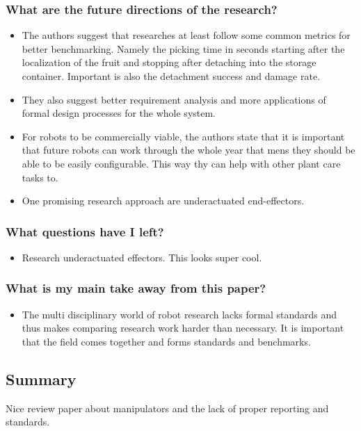     \subsubsection*{What are the future directions of the research?}
    \begin{itemize}
        \item The authors suggest that researches at least follow some common metrics for better benchmarking. Namely the picking time in seconds starting after the localization of the fruit and stopping after detaching into the storage container. Important is also the detachment success and damage rate.
        \item They also suggest better requirement analysis and more applications of formal design processes for the whole system.
        \item For robots to be commercially viable, the authors state that it is important that future robots can work through the whole year that mens they should be able to be easily configurable. This way thy can help with other plant care tasks to.  
        \item One promising research approach are underactuated end-effectors. 
    \end{itemize}
    \subsubsection*{What questions have I left?}
    \begin{itemize}
        \item Research underactuated effectors. This looks super cool.
    \end{itemize}
    \subsubsection*{What is my main take away from this paper?}
    \begin{itemize}
        \item The multi disciplinary world of robot research lacks formal standards and thus makes comparing research work harder than necessary. It is important that the field comes together and forms standards and benchmarks.
    \end{itemize}
    
    \subsection*{Summary}
    Nice review paper about manipulators and the lack of proper reporting and standards.
    

